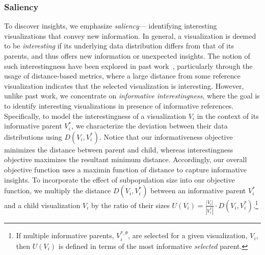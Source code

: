 \subsubsection{Saliency}
To discover insights, we emphasize \emph{saliency}--- identifying interesting visualizations that convey new information. In general, a visualization is deemed to be \emph{interesting} if its underlying data distribution differs from that of its parents, and thus offers new information or unexpected insights. The notion of such interestingness have been explored in past work~\cite{Correll2016,Itti2009,Vartak2015}, particularly through the usage of distance-based metrics, where a large distance from some reference visualization indicates that the selected visualization is interesting. However, unlike past work, we concentrate on \emph{informative interestingness}, where the goal is to identify interesting visualizations in presence of informative references. Specifically, to model the interestingness of a visualization $V_i$ in the context of its informative parent $V_i^*$, we characterize the deviation between their data distributions using $D(V_i, V_i^*)$. Notice that our informativeness objective minimizes the distance between parent and child, whereas interestingness objective maximizes the resultant minimum distance. Accordingly, our overall objective function uses a maximin function of distance to capture informative insights. To incorporate the effect of subpopulation size into our objective function, we multiply the distance $D(V_i, V_i^*)$ between an informative parent $V_i^*$ and a child visualization $V_i$ by the ratio of their sizes  $U(V_i) = \frac{|V_i|}{|V_i^*|} \cdot D(V_i, V_i^*)$.\footnote{If multiple informative parents, $V_i^{*, \theta}$, are selected for a given visualization, $V_i$, then $U(V_i)$ is defined in terms of the most informative {\em selected} parent.}
